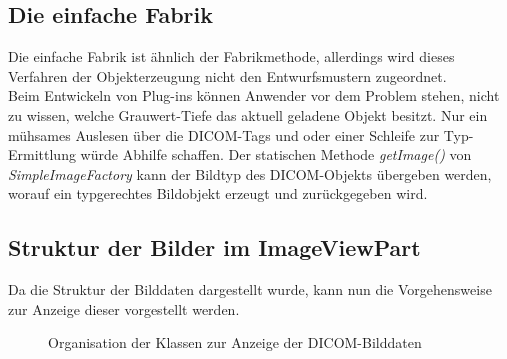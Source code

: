 \subsection{Die einfache Fabrik}

Die einfache Fabrik ist ähnlich der Fabrikmethode, allerdings wird dieses Verfahren der Objekterzeugung nicht den Entwurfsmustern zugeordnet.\\
Beim Entwickeln von Plug-ins können Anwender vor dem Problem stehen, nicht zu wissen, welche Grauwert-Tiefe das aktuell geladene Objekt besitzt. Nur ein mühsames Auslesen über die DICOM-Tags und oder einer Schleife zur Typ-Ermittlung würde Abhilfe schaffen. Der statischen Methode \textit{getImage()} von \textit{SimpleImageFactory} kann der Bildtyp des DICOM-Objekts übergeben werden, worauf ein typgerechtes Bildobjekt erzeugt und zurückgegeben wird.

\subsection{Struktur der Bilder im ImageViewPart} \label{ivp_architecture}

Da die Struktur der Bilddaten dargestellt wurde, kann nun die Vorgehensweise zur Anzeige dieser vorgestellt werden.\\

\begin{figure}[htbp]
  \vspace{0.5cm}
  \centering
  \caption{Organisation der Klassen zur Anzeige der DICOM-Bilddaten}
  \label{imageview}
  \vspace{0.5cm}
\end{figure}

